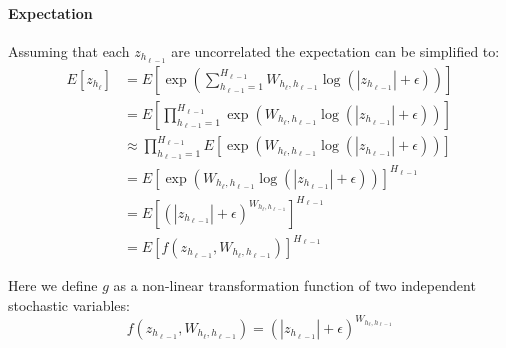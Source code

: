 \paragraph{Expectation} Assuming that each $z_{h_{\ell-1}}$ are uncorrelated the expectation can be simplified to:
\begin{equation}
\begin{aligned}
E[z_{h_\ell}] &= E\left[\exp\left(\sum_{h_{\ell-1}=1}^{H_{\ell-1}} W_{h_{\ell}, h_{\ell-1}} \log(|z_{h_{\ell-1}}| + \epsilon) \right)\right] \\
&= E\left[\prod_{h_{\ell-1}=1}^{H_{\ell-1}} \exp(W_{h_{\ell}, h_{\ell-1}} \log(|z_{h_{\ell-1}}| + \epsilon)) \right] \\
&\approx \prod_{h_{\ell-1}=1}^{H_{\ell-1}} E[\exp(W_{h_{\ell}, h_{\ell-1}} \log(|z_{h_{\ell-1}}| + \epsilon))] \\
&= E[\exp(W_{h_{\ell}, h_{\ell-1}} \log(|z_{h_{\ell-1}}| + \epsilon))]^{H_{\ell-1}} \\
&= E\left[(|z_{h_{\ell-1}}| + \epsilon)^{W_{h_{\ell}, h_{\ell-1}}}\right]^{H_{\ell-1}} \\
&= E\left[f(z_{h_{\ell-1}}, W_{h_{\ell}, h_{\ell-1}})\right]^{H_{\ell-1}}
\end{aligned}
\end{equation}

Here we define $g$ as a non-linear transformation function of two independent stochastic variables:
\begin{equation}
f(z_{h_{\ell-1}}, W_{h_{\ell}, h_{\ell-1}}) = (|z_{h_{\ell-1}}| + \epsilon)^{W_{h_{\ell}, h_{\ell-1}}}
\end{equation}


